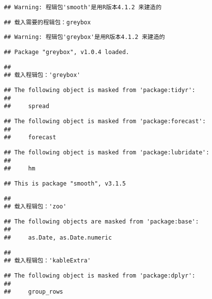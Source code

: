 \documentclass[
]{article}
\begin{document}
\begin{verbatim}
## Warning: 程辑包'smooth'是用R版本4.1.2 来建造的
\end{verbatim}

\begin{verbatim}
## 载入需要的程辑包：greybox
\end{verbatim}

\begin{verbatim}
## Warning: 程辑包'greybox'是用R版本4.1.2 来建造的
\end{verbatim}

\begin{verbatim}
## Package "greybox", v1.0.4 loaded.
\end{verbatim}

\begin{verbatim}
## 
## 载入程辑包：'greybox'
\end{verbatim}

\begin{verbatim}
## The following object is masked from 'package:tidyr':
## 
##     spread
\end{verbatim}

\begin{verbatim}
## The following object is masked from 'package:forecast':
## 
##     forecast
\end{verbatim}

\begin{verbatim}
## The following object is masked from 'package:lubridate':
## 
##     hm
\end{verbatim}

\begin{verbatim}
## This is package "smooth", v3.1.5
\end{verbatim}

\begin{verbatim}
## 
## 载入程辑包：'zoo'
\end{verbatim}

\begin{verbatim}
## The following objects are masked from 'package:base':
## 
##     as.Date, as.Date.numeric
\end{verbatim}

\begin{verbatim}
## 
## 载入程辑包：'kableExtra'
\end{verbatim}

\begin{verbatim}
## The following object is masked from 'package:dplyr':
## 
##     group_rows
\end{verbatim}
\end{document}

